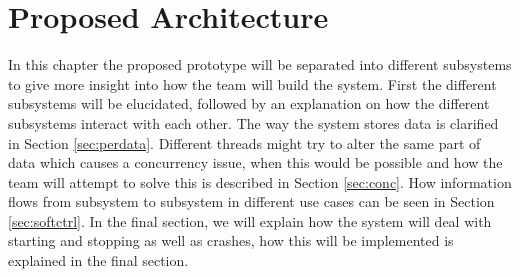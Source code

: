 \chapter{Proposed Architecture}
In this chapter the proposed prototype will be separated into different subsystems to give more insight into how the team will build the system. First the different subsystems will be elucidated, followed by an explanation on how the different subsystems interact with each other. The way the system stores data is clarified in Section \ref{sec:perdata}. Different threads might try to alter the same part of data which causes a concurrency issue, when this would be possible and how the team will attempt to solve this is described in Section \ref{sec:conc}. How information flows from subsystem to subsystem in different use cases can be seen in Section \ref{sec:softctrl}. In the final section, we will explain how the system will deal with starting and stopping as well as crashes, how this will be implemented is explained in the final section.
